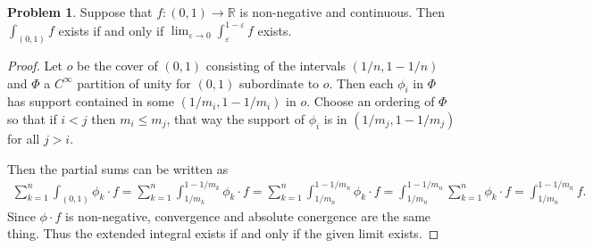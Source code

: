 \documentclass[20pt]{article}
\theoremstyle{plain}
\theoremstyle{definition}
\newtheorem*{problem}{Problem}
\newcommand{\reals}{\mathbb{R}}
\begin{document}
\begin{problem}{3.37}
  Suppose that $f: (0, 1) \to \reals$ is non-negative and continuous.
  Then $\int_{(0,1)}f$ exists if and only if 
  $\lim_{\varepsilon \to 0} \int_\varepsilon^{1-\varepsilon}f$ exists.
\end{problem}

\begin{proof}
  Let $o$ be the cover of $(0, 1)$ consisting of the intervals
  $(1/n, 1 - 1/n)$ and $\Phi$ a $C^\infty$ partition of unity for $(0, 1)$
  subordinate to $o$.
  Then each $\phi_i$ in $\Phi$ has support contained in some 
  $(1/m_i, 1 - 1/m_i)$ in $o$.
  Choose an ordering of $\Phi$ so that if $i < j$ then $m_i \leq m_j$, that way
  the support of $\phi_i$ is in $ (1 / m_j, 1 - 1/m_j) $ for all $j > i.$

  Then the partial sums can be written as
  \begin{align*}
    \sum_{k=1}^n \int_{(0, 1)} \phi_k \cdot f = 
    \sum_{k=1}^n \int_{1/m_k}^{1 - 1/m_k} \phi_k \cdot f = 
    \sum_{k=1}^n \int_{1/m_n}^{1 - 1/m_n} \phi_k \cdot f =  
    \int_{1/m_n}^{1 - 1/m_n} \sum_{k=1}^n  \phi_k \cdot f =  
    \int_{1/m_n}^{1 - 1/m_n} f.
  \end{align*}
  Since $\phi \cdot f$ is non-negative, convergence and absolute conergence
  are the same thing. Thus the extended integral exists if and only if the 
  given limit exists.
\end{proof}
\end{document}
